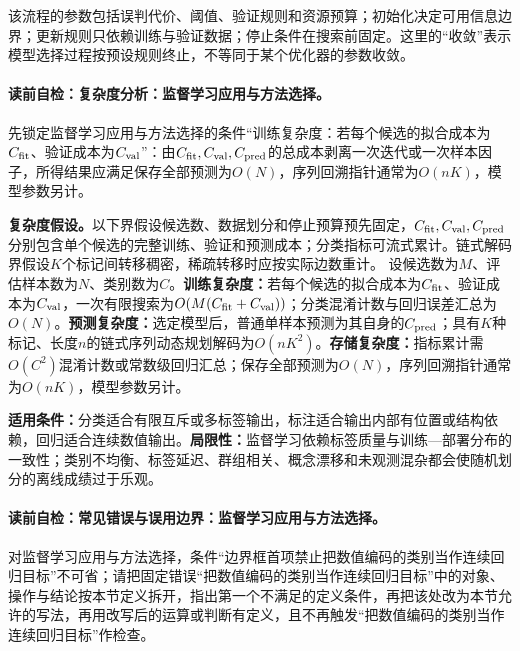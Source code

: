 该流程的参数包括误判代价、阈值、验证规则和资源预算；初始化决定可用信息边界；更新规则只依赖训练与验证数据；停止条件在搜索前固定。这里的“收敛”表示模型选择过程按预设规则终止，不等同于某个优化器的参数收敛。

\label{struct:V1-C11-CH26}
\label{struct:V1-C11-CH27}
\paragraph{读前自检：复杂度分析：监督学习应用与方法选择。}先锁定监督学习应用与方法选择的条件“训练复杂度：若每个候选的拟合成本为$C_{\rm fit}$、验证成本为$C_{\rm val}$”：由$C_{\rm fit},C_{\rm val},C_{\rm pred}$的总成本剥离一次迭代或一次样本因子，所得结果应满足保存全部预测为$O(N)$，序列回溯指针通常为$O(nK)$，模型参数另计。\par

\begin{complexitybox}
\textbf{复杂度假设。}以下界假设候选数、数据划分和停止预算预先固定，$C_{\rm fit},C_{\rm val},C_{\rm pred}$分别包含单个候选的完整训练、验证和预测成本；分类指标可流式累计。链式解码界假设$K$个标记间转移稠密，稀疏转移时应按实际边数重计。
设候选数为$M$、评估样本数为$N$、类别数为$C$。\textbf{训练复杂度：}若每个候选的拟合成本为$C_{\rm fit}$、验证成本为$C_{\rm val}$，一次有限搜索为$O(M(C_{\rm fit}+C_{\rm val}))$；分类混淆计数与回归误差汇总为$O(N)$。\textbf{预测复杂度：}选定模型后，普通单样本预测为其自身的$C_{\rm pred}$；具有$K$种标记、长度$n$的链式序列动态规划解码为$O(nK^2)$。\textbf{存储复杂度：}指标累计需$O(C^2)$混淆计数或常数级回归汇总；保存全部预测为$O(N)$，序列回溯指针通常为$O(nK)$，模型参数另计。
\end{complexitybox}

\label{struct:V1-C11-CH28}
\label{struct:V1-C11-CH29}
\begin{applicabilitybox}
\textbf{适用条件：}分类适合有限互斥或多标签输出，标注适合输出内部有位置或结构依赖，回归适合连续数值输出。\textbf{局限性：}监督学习依赖标签质量与训练—部署分布的一致性；类别不均衡、标签延迟、群组相关、概念漂移和未观测混杂都会使随机划分的离线成绩过于乐观。
\end{applicabilitybox}

\label{struct:V1-C11-CH30}
\paragraph{读前自检：常见错误与误用边界：监督学习应用与方法选择。}对监督学习应用与方法选择，条件“边界框首项禁止把数值编码的类别当作连续回归目标”不可省；请把固定错误“把数值编码的类别当作连续回归目标”中的对象、操作与结论按本节定义拆开，指出第一个不满足的定义条件，再把该处改为本节允许的写法，再用改写后的运算或判断有定义，且不再触发“把数值编码的类别当作连续回归目标”作检查。\par

